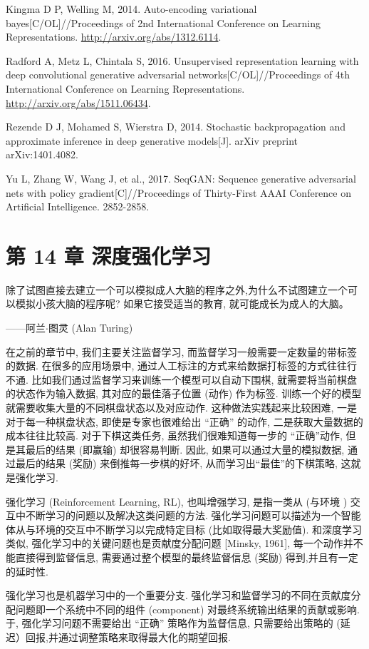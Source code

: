 \documentclass[10pt]{article}
\begin{document}
Kingma D P, Welling M, 2014. Auto-encoding variational bayes[C/OL]//Proceedings of 2nd International Conference on Learning Representations. \href{http://arxiv.org/abs/1312.6114}{http://arxiv.org/abs/1312.6114}.

Radford A, Metz L, Chintala S, 2016. Unsupervised representation learning with deep convolutional generative adversarial networks[C/OL]//Proceedings of 4th International Conference on Learning Representations. \href{http://arxiv.org/abs/1511.06434}{http://arxiv.org/abs/1511.06434}.

Rezende D J, Mohamed S, Wierstra D, 2014. Stochastic backpropagation and approximate inference in deep generative models[J]. arXiv preprint arXiv:1401.4082.

Yu L, Zhang W, Wang J, et al., 2017. SeqGAN: Sequence generative adversarial nets with policy gradient[C]//Proceedings of Thirty-First AAAI Conference on Artificial Intelligence. 2852-2858.

\section*{第 14 章 深度强化学习}
除了试图直接去建立一个可以模拟成人大脑的程序之外,为什么不试图建立一个可以模拟小孩大脑的程序呢? 如果它接受适当的教育, 就可能成长为成人的大脑。

——阿兰$\cdot$图灵 (Alan Turing)

在之前的章节中, 我们主要关注监督学习, 而监督学习一般需要一定数量的带标签的数据. 在很多的应用场景中, 通过人工标注的方式来给数据打标签的方式往往行不通. 比如我们通过监督学习来训练一个模型可以自动下围棋, 就需要将当前棋盘的状态作为输入数据, 其对应的最佳落子位置 (动作) 作为标签. 训练一个好的模型就需要收集大量的不同棋盘状态以及对应动作. 这种做法实践起来比较困难, 一是对于每一种棋盘状态, 即使是专家也很难给出 “正确” 的动作, 二是获取大量数据的成本往往比较高. 对于下棋这类任务, 虽然我们很难知道每一步的 “正确”动作, 但是其最后的结果 (即赢输) 却很容易判断. 因此, 如果可以通过大量的模拟数据, 通过最后的结果 (奖励) 来倒推每一步棋的好坏, 从而学习出“最佳”的下棋策略, 这就是强化学习.

强化学习 (Reinforcement Learning, RL), 也叫增强学习, 是指一类从 (与环境 ) 交互中不断学习的问题以及解决这类问题的方法. 强化学习问题可以描述为一个智能体从与环境的交互中不断学习以完成特定目标 (比如取得最大奖励值). 和深度学习类似, 强化学习中的关键问题也是贡献度分配问题 [Minsky, 1961], 每一个动作并不能直接得到监督信息, 需要通过整个模型的最终监督信息 (奖励) 得到,并且有一定的延时性.

强化学习也是机器学习中的一个重要分支. 强化学习和监督学习的不同在贡献度分配问题即一个系统中不同的组件 (component) 对最终系统输出结果的贡献或影响.于, 强化学习问题不需要给出 “正确” 策略作为监督信息, 只需要给出策略的 (延迟）回报,并通过调整策略来取得最大化的期望回报.
\end{document}
